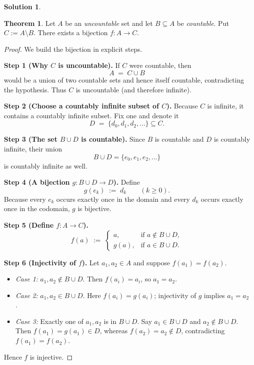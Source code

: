 \documentclass[12pt]{article}
\theoremstyle{definition} %
\newtheorem{solution}{Solution}
\newtheorem{theorem}{Theorem}
\theoremstyle{plain} %
\begin{document}
  \begin{solution}
    \begin{theorem}
      \label{thm:uncountable-minus-countable}
      Let $A$ be an \emph{uncountable} set and let $B\subseteq A$ be
      \emph{countable}.
      Put $C:=A\setminus B$.
      There exists a bijection $f\colon A\to C$.
      \end{theorem}
      
      \begin{proof}
      We build the bijection in explicit steps.
      
      \bigskip
      \textbf{Step 1 (Why $C$ is uncountable).}
      If $C$ were countable, then
      \[
         A \;=\; C\cup B
      \]
      would be a union of two countable sets and hence itself countable,
      contradicting the hypothesis.
      Thus $C$ is uncountable (and therefore infinite).
      
      \bigskip
      \textbf{Step 2 (Choose a countably infinite subset of $C$).}
      Because $C$ is infinite, it contains a countably infinite subset.
      Fix one and denote it
      \[
        D \;=\; \{d_0,d_1,d_2,\dots\}\subseteq C.
      \]
      
      \bigskip
      \textbf{Step 3 (The set $B\cup D$ is countable).}
      Since $B$ is countable and $D$ is countably infinite,
      their union
      \[
        B\cup D=\{e_0,e_1,e_2,\dots\}
      \]
      is countably infinite as well.
      
      \bigskip
      \textbf{Step 4 (A bijection $g\colon B\cup D \to D$).}
      Define
      \[
        g(e_k) \;:=\; d_k\qquad(k\ge 0).
      \]
      Because every $e_k$ occurs exactly once in the domain and
      every $d_k$ occurs exactly once in the codomain,
      $g$ is bijective.
      
      \bigskip
      \textbf{Step 5 (Define $f\colon A\to C$).}
      \[
        f(a)\;:=\;
        \begin{cases}
          a,   &\text{if }a\notin B\cup D,\\[6pt]
          g(a),&\text{if }a\in B\cup D.
        \end{cases}
      \]
      
      \bigskip
      \textbf{Step 6 (Injectivity of $f$).}
      Let $a_1,a_2\in A$ and suppose $f(a_1)=f(a_2)$.
      
      \begin{itemize}
        \item \emph{Case 1:} $a_1,a_2\notin B\cup D$.  
              Then $f(a_i)=a_i$, so $a_1=a_2$.
        \item \emph{Case 2:} $a_1,a_2\in B\cup D$.  
              Here $f(a_i)=g(a_i)$; injectivity of $g$ implies $a_1=a_2$.
        \item \emph{Case 3:} Exactly one of $a_1,a_2$ is in $B\cup D$.  
              Say $a_1\in B\cup D$ and $a_2\notin B\cup D$.  
              Then $f(a_1)=g(a_1)\in D$, whereas $f(a_2)=a_2\notin D$,
              contradicting $f(a_1)=f(a_2)$.
      \end{itemize}
      Hence $f$ is injective.
      

\end{proof}
\end{solution}
\end{document}
